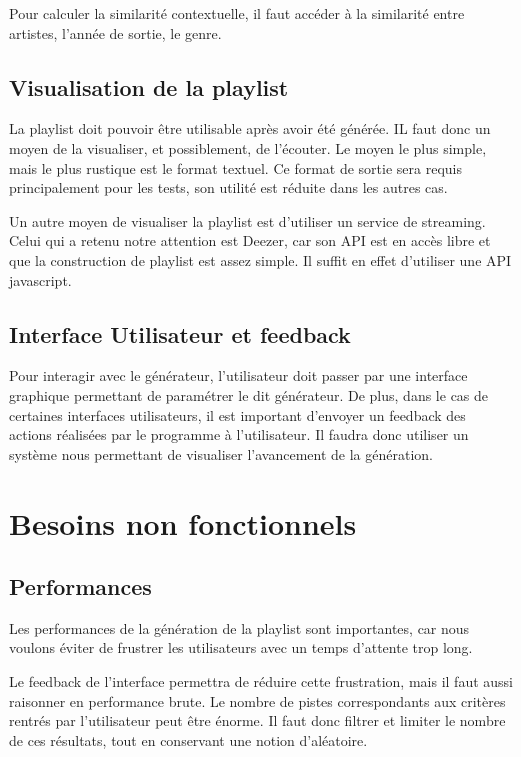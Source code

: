 \documentclass[11pt,a4paper]{article}
\begin{document}
Pour calculer la similarité contextuelle, il faut accéder à la similarité entre
artistes, l’année de sortie, le genre.

\subsection{Visualisation de la playlist}

La playlist doit pouvoir être utilisable après avoir été générée. IL faut donc un
moyen de la visualiser, et possiblement, de l’écouter.
Le moyen le plus simple, mais le plus rustique est le format textuel. Ce format
de sortie sera requis principalement pour les tests, son utilité est réduite dans
les autres cas.

Un autre moyen de visualiser la playlist est d’utiliser un service de streaming.
Celui qui a retenu notre attention est Deezer, car son API est en accès libre et
que la construction de playlist est assez simple. Il suffit en effet d’utiliser
une API javascript.
        
\subsection{Interface Utilisateur et feedback}
\label{sec:interface}

Pour interagir avec le générateur, l’utilisateur doit passer par une interface
graphique permettant de paramétrer le dit générateur.
De plus, dans le cas de certaines interfaces utilisateurs, il est important
d’envoyer un feedback des actions réalisées par le programme à l’utilisateur. Il
faudra donc utiliser un système nous permettant de visualiser l’avancement de la
génération.

\newpage

\section{Besoins non fonctionnels}
\label{sec:n-fonc}

\subsection{Performances}

Les performances de la génération de la playlist sont importantes, car nous
voulons éviter de frustrer les utilisateurs avec un temps d'attente trop long.

Le feedback de l’interface permettra de réduire cette frustration, mais il faut
aussi raisonner en performance brute. Le nombre de pistes correspondants aux
critères rentrés par l’utilisateur peut être énorme. Il faut donc filtrer et
limiter le nombre de ces résultats, tout en conservant une notion d’aléatoire.
\end{document}

